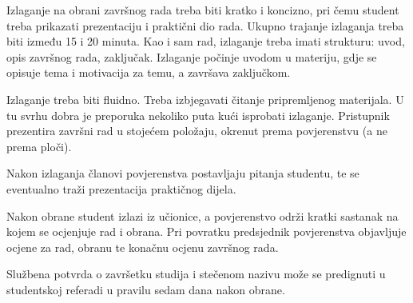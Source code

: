Izlaganje na obrani završnog rada treba biti kratko i koncizno, pri čemu student treba prikazati prezentaciju i praktični dio rada. Ukupno trajanje izlaganja treba biti između 15 i 20 minuta. Kao i sam rad, izlaganje treba imati strukturu: uvod, opis završnog rada, zaključak. Izlaganje počinje uvodom u materiju, gdje se opisuje tema i motivacija za temu, a završava zaključkom.

Izlaganje treba biti fluidno. Treba izbjegavati čitanje pripremljenog materijala. U tu svrhu dobra je preporuka nekoliko puta kući isprobati izlaganje. Pristupnik prezentira završni rad u stojećem položaju, okrenut prema povjerenstvu (a ne prema ploči).

Nakon izlaganja članovi povjerenstva postavljaju pitanja studentu, te se eventualno traži prezentacija praktičnog dijela. 

Nakon obrane student izlazi iz učionice, a povjerenstvo održi kratki sastanak na kojem se ocjenjuje rad i obrana. Pri povratku predsjednik povjerenstva objavljuje ocjene za rad, obranu te konačnu ocjenu završnog rada. 

Službena potvrda o završetku studija i stečenom nazivu može se predignuti u studentskoj referadi u pravilu sedam dana nakon obrane.